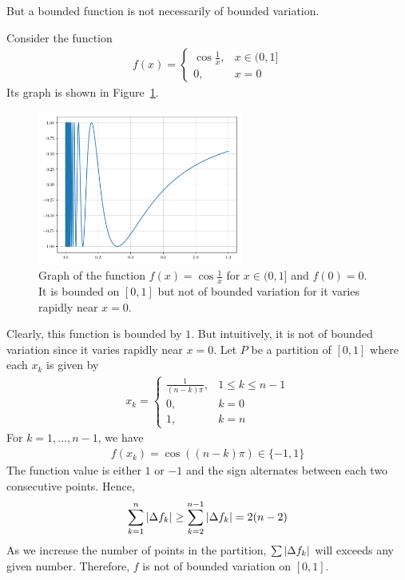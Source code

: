 \documentclass[thmcnt=section, color=blue, 12pt]{my-elegantbook}
\begin{document}
But a bounded function is not necessarily of bounded variation.

\begin{example} \label{eg:1}
	Consider the function
	\begin{align*}
		f(x) = \begin{cases}
			       \cos \frac{1}{x}, & x \in (0, 1] \\
			       0,                & x = 0
		       \end{cases}
	\end{align*}
	Its graph is shown in Figure~\ref{fig:1}.
	\begin{figure}[H]
		\centering
		\includegraphics[width=0.6\textwidth]{figures/bounded-function-that-is-not-of-bounded-variation.png}
		\caption{Graph of the function $f(x) = \cos\frac{1}{x}$ for $x \in (0, 1]$ and $f(0) = 0$. It is bounded on $[0, 1]$ but not of bounded variation for it varies rapidly near $x=0$.}
		\label{fig:1}
	\end{figure}
	Clearly, this function is bounded by $1$.
	But intuitively, it is not of bounded variation since it varies rapidly
	near $x=0$.
	Let $P$ be a partition of $[0, 1]$ where each $x_k$ is given by
	\begin{align*}
		x_k = \begin{cases}
			      \frac{1}{(n-k) \pi}, & 1 \leq k \leq n-1 \\
			      0,                   & k = 0             \\
			      1,                   & k = n
		      \end{cases}
	\end{align*}
	For $k=1, \dots, n-1$, we have
	\begin{align*}
		f(x_k) = \cos ( (n-k) \pi ) \in \{-1, 1\}
	\end{align*}
	The function value is either $1$ or $-1$ and the sign alternates between
	each two consecutive points. Hence,
	\begin{align*}
		\sum_{k=1}^{n} \left\lvert \Delta f_k \right\rvert
		\geq \sum_{k=2}^{n-1} \left\lvert \Delta f_k \right\rvert = 2 (n - 2)
	\end{align*}
	As we increase the number of points in the partition, $\sum \left\lvert \Delta f_k \right\rvert$
	will exceeds any given number.
	Therefore, $f$ is not of bounded variation on $[0, 1]$.
\end{example}
\end{document}
